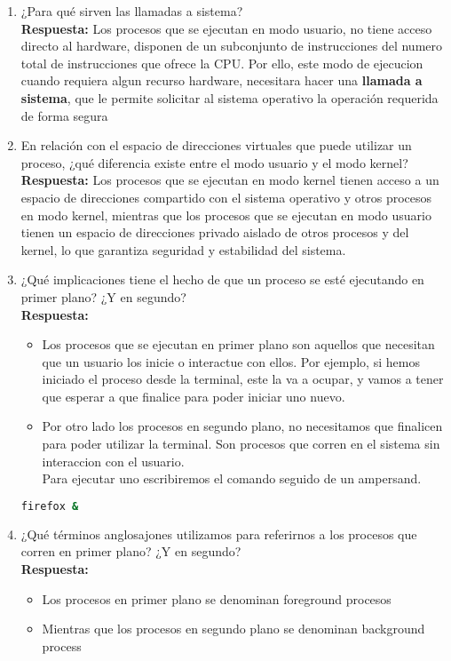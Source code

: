\documentclass[a4paper,12pt]{article}
\begin{document}
\begin{enumerate}[label=\textbf{Pregunta \arabic*.}]
    \item ¿Para qué sirven las llamadas a sistema? \\ %
    \textbf{Respuesta:} 
    Los procesos que se ejecutan en modo usuario, no tiene acceso directo al hardware, disponen de un subconjunto de instrucciones del numero total de instrucciones que ofrece la CPU. Por ello, este modo de ejecucion cuando requiera algun recurso hardware, necesitara hacer una \textbf{llamada a sistema}, que le permite solicitar al sistema operativo la operación requerida de forma segura
    \newpage
    \item En relación con el espacio de direcciones virtuales que puede utilizar un proceso, ¿qué diferencia existe entre el modo usuario y el modo kernel? \\ %
    \textbf{Respuesta:} 
    Los procesos que se ejecutan en modo kernel tienen acceso a un espacio de direcciones compartido con el sistema operativo y otros procesos en modo kernel, mientras que los procesos que se ejecutan en modo usuario tienen un espacio de direcciones privado aislado de otros procesos y del kernel, lo que garantiza seguridad y estabilidad del sistema.

    

    \item ¿Qué implicaciones tiene el hecho de que un proceso se esté ejecutando en primer plano? ¿Y en segundo? \\ %
    \textbf{Respuesta:} 
    \begin{itemize}
        \item Los procesos que se ejecutan en primer plano son aquellos que necesitan que un usuario los inicie o interactue con ellos. Por ejemplo, si hemos iniciado el proceso desde la terminal, este la va a ocupar, y vamos a tener que esperar a que finalice para poder iniciar uno nuevo.
        \item Por otro lado los procesos en segundo plano, no necesitamos que finalicen para poder utilizar la terminal. Son procesos que corren en el sistema sin interaccion con el usuario. \\
        Para ejecutar uno escribiremos el comando seguido de un ampersand.
    \end{itemize}
    
    \begin{lstlisting}[language=bash]
        firefox &
\end{lstlisting}


    \item ¿Qué términos anglosajones utilizamos para referirnos a los procesos que corren en primer plano? ¿Y en segundo? \\ %
    \textbf{Respuesta:} 
    \begin{itemize}
        \item Los procesos en primer plano se denominan foreground procesos
        \item Mientras que los procesos en segundo plano se denominan background process
    \end{itemize}


\end{enumerate}
\end{document}
